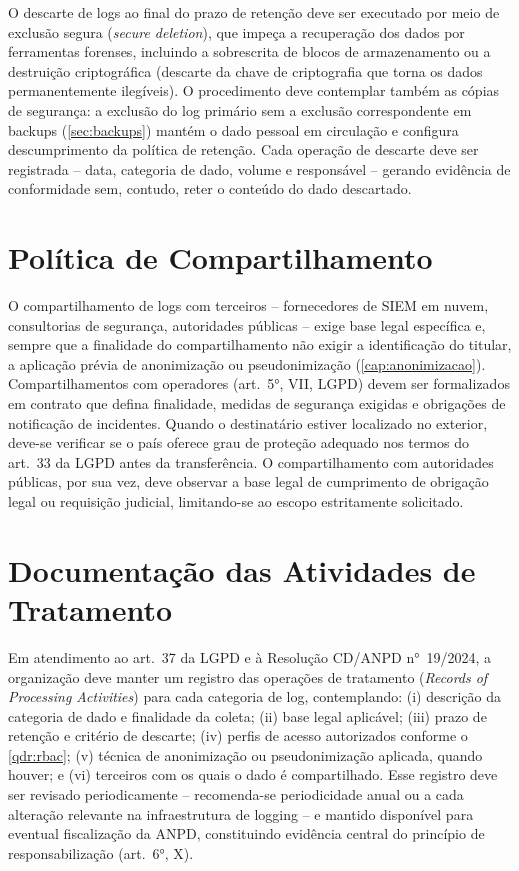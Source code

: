 O descarte de logs ao final do prazo de retenção deve ser executado por meio de exclusão segura (\textit{secure deletion}), que impeça a recuperação dos dados por ferramentas forenses, incluindo a sobrescrita de blocos de armazenamento ou a destruição criptográfica (descarte da chave de criptografia que torna os dados permanentemente ilegíveis). O procedimento deve contemplar também as cópias de segurança: a exclusão do log primário sem a exclusão correspondente em backups (\autoref{sec:backups}) mantém o dado pessoal em circulação e configura descumprimento da política de retenção. Cada operação de descarte deve ser registrada -- data, categoria de dado, volume e responsável -- gerando evidência de conformidade sem, contudo, reter o conteúdo do dado descartado.

\section{Política de Compartilhamento}
\label{sec:politica-compartilhamento}

O compartilhamento de logs com terceiros -- fornecedores de SIEM em nuvem, consultorias de segurança, autoridades públicas -- exige base legal específica e, sempre que a finalidade do compartilhamento não exigir a identificação do titular, a aplicação prévia de anonimização ou pseudonimização (\autoref{cap:anonimizacao}). Compartilhamentos com operadores (art.\ 5°, VII, LGPD) devem ser formalizados em contrato que defina finalidade, medidas de segurança exigidas e obrigações de notificação de incidentes. Quando o destinatário estiver localizado no exterior, deve-se verificar se o país oferece grau de proteção adequado nos termos do art.\ 33 da LGPD antes da transferência. O compartilhamento com autoridades públicas, por sua vez, deve observar a base legal de cumprimento de obrigação legal ou requisição judicial, limitando-se ao escopo estritamente solicitado.

\section{Documentação das Atividades de Tratamento}
\label{sec:documentacao}

Em atendimento ao art.\ 37 da LGPD e à Resolução CD/ANPD n°~19/2024, a organização deve manter um registro das operações de tratamento (\textit{Records of Processing Activities}) para cada categoria de log, contemplando: (i) descrição da categoria de dado e finalidade da coleta; (ii) base legal aplicável; (iii) prazo de retenção e critério de descarte; (iv) perfis de acesso autorizados conforme o \autoref{qdr:rbac}; (v) técnica de anonimização ou pseudonimização aplicada, quando houver; e (vi) terceiros com os quais o dado é compartilhado. Esse registro deve ser revisado periodicamente -- recomenda-se periodicidade anual ou a cada alteração relevante na infraestrutura de logging -- e mantido disponível para eventual fiscalização da ANPD, constituindo evidência central do princípio de responsabilização (art.\ 6°, X).